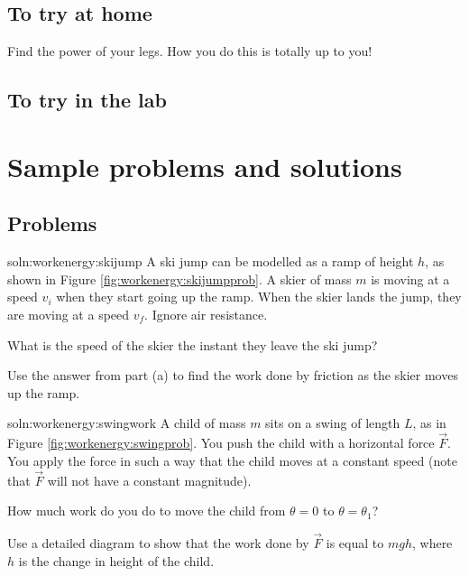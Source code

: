 \subsection{To try at home}

\begin{tQuestion}Find the power of your legs. How you do this is totally up to you! \end{tQuestion}

\subsection{To try in the lab}

\newpage
\section{Sample problems and solutions}
\subsection{Problems}
\begin{problemParts}{soln:workenergy:skijump}{\label{prob:workenergy:skijump} A ski jump can be modelled as a ramp of height $h$, as shown in Figure \ref{fig:workenergy:skijumpprob}. A skier of mass $m$ is moving at a speed $v_i$ when they start going up the ramp. When the skier lands the jump, they are moving at a speed $v_f$. Ignore air resistance. 
}
\item What is the speed of the skier the instant they leave the ski jump?
\item Use the answer from part (a) to find the work done by friction as the skier moves up the ramp.
\end{problemParts}


\begin{problemParts}{soln:workenergy:swingwork}{\label{prob:workenergy:swingwork}
A child of mass $m$ sits on a swing of length $L$, as in Figure \ref{fig:workenergy:swingprob}. You push the child with a horizontal force $\vec F$. You apply the force in such a way that the child moves at a constant speed (note that $\vec F$ will not have a constant magnitude).}
\item How much work do you do to move the child from $\theta=0$ to $\theta=\theta_1$? 
\item Use a detailed diagram to show that the work done by $\vec F$ is equal to $mgh$, where $h$ is the change in height of the child. 
\end{problemParts}

